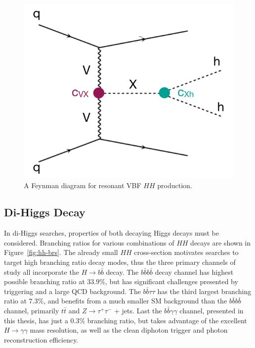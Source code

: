 \begin{figure}[!htbp]
    \centering
    \includegraphics[width=.45\textwidth]{chapters/chapter1_theory/images/vbf_resonant.png}
    \caption{A Feynman diagram for resonant VBF $HH$ production.}
    \label{fig:vbf-resonant}
\end{figure}


\subsection{Di-Higgs Decay}\label{ssec:dihiggs-decay}

In di-Higgs searches, properties of both decaying Higgs decays must be considered. Branching ratios for various combinations of $HH$ decays are shown in Figure~\ref{fig:hh-brs}. The already small $HH$ cross-section motivates searches to target high branching ratio decay modes, thus the three primary channels of study all incorporate the $H\rightarrow b\bar{b}$ decay. The $b\bar{b}b\bar{b}$ decay channel has highest possible branching ratio at $33.9\%$, but has significant challenges presented by triggering and a large \gls{QCD} background. The $b\bar{b}\tau \tau$ has the third largest branching ratio at $7.3\%$, and benefits from a much smaller \gls{SM} background than the $b\bar{b}b\bar{b}$ channel, primarily $t\bar{t}$ and $Z\rightarrow \tau^+ \tau^-$ + jets. Last the $b\bar{b} \gamma \gamma$ channel, presented in this thesis, has just a $0.3\%$ branching ratio, but takes advantage of the excellent $H\rightarrow \gamma\gamma$ mass resolution, as well as the clean diphoton trigger and photon reconstruction efficiency.

